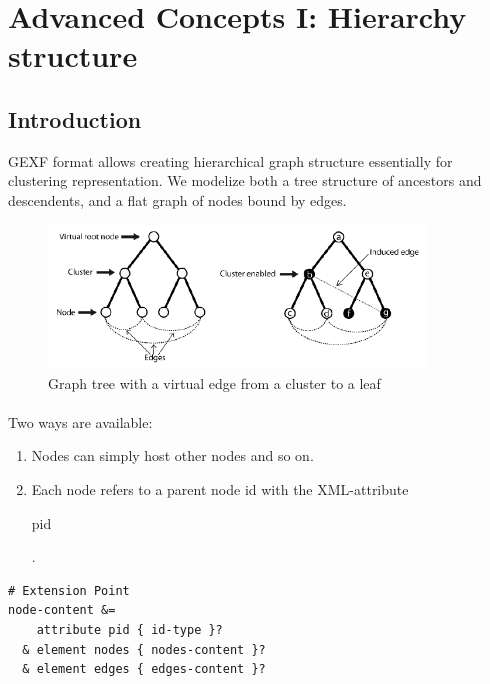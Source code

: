 \documentclass[a4paper,10pt]{article}
\begin{document}
\section{Advanced Concepts I: Hierarchy structure} \label{hierarchy}

\subsection{Introduction}

GEXF format allows creating hierarchical graph structure essentially for clustering representation. We modelize both a tree structure of ancestors and descendents, and a flat graph of nodes bound by edges.

\begin{figure}[!ht]
  \begin{center}
  \includegraphics[width=10cm,keepaspectratio=true]{res/hierarchy.png}
  \caption{Graph tree with a virtual edge from a cluster to a leaf}
  \end{center}
\end{figure}

\paragraph{}
Two ways are available:
\begin{enumerate}
 \item Nodes can simply host other nodes and so on.
 \item Each node refers to a parent node id with the XML-attribute \begin{footnotesize}pid\end{footnotesize}.
\end{enumerate}

\lstset{ style=rnc }
\begin{lstlisting}[caption={Hierarchy Specification},label=hierarchyRNC]
# Extension Point
node-content &=
    attribute pid { id-type }?
  & element nodes { nodes-content }?
  & element edges { edges-content }?
\end{lstlisting}
\end{document}
